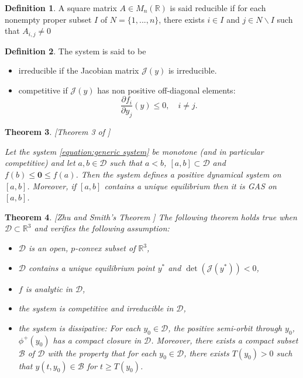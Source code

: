 \documentclass{article}
\newcommand{\R}{\mathbb{R}}
\newtheorem{theorem}{Theorem}
\theoremstyle{definition}
\newtheorem{definition}[theorem]{Definition}
\theoremstyle{remark}
\begin{document}
\begin{appendix}
\begin{definition}\cite{kaszkurewicz_matrix_2012}
A square matrix $A \in M_n (\mathbb{R})$ is said reducible if 
for each nonempty proper subset $I$ of $N = \{1, ..., n\}$, there exists $i \in I$ and $j \in N\backslash I$ such that $A_{i,j} \neq 0$
\end{definition}


\begin{definition} \label{def:monotone}\cite{smith_monotone_1995} The system is said to be 
\begin{itemize}
\item irreducible if the Jacobian matrix $\mathcal{J}(y)$ is irreducible.
\item competitive if $\mathcal{J}(y)$ has non positive off-diagonal elements:
$$ \dfrac{\partial f_i}{\partial y_j}(y) \leq 0, \quad i \neq j.
$$
\end{itemize}
\end{definition}

\begin{theorem} \label{theorem: monotone GAS} [Theorem 3 of \cite{anguelov_monotone_2010}]

Let the system \eqref{equation:generic system} be monotone (and in particular competitive) and let $a,b \in \mathcal{D}$ such that $a <b$, $[a, b] \subset \mathcal{D}$ and $f(b) \leq \mathbf{0} \leq f(a)$. Then the system defines a positive dynamical system on $[a, b] $. Moreover, if $[a, b] $ contains a unique equilibrium then it is GAS on $[a, b] $.
\end{theorem}

\begin{theorem}\label{theorem:Zhu} [Zhu and Smith's Theorem \cite{zhu_stable_1994}]
The following theorem holds true when $\mathcal{D} \subset \R^3$ and verifies the following assumption:
\begin{itemize}
\item $\mathcal{D}$ is an open, $p$-convex subset of $\mathbb{R}^3$,
\item $\mathcal{D}$ contains a unique equilibrium point $y^*$ and $\det(\mathcal{J}(y^*)) < 0$,
\item $f$ is analytic in $\mathcal{D}$,
\item the system is competitive and irreducible in $\mathcal{D}$,
\item the system is dissipative: For each $y_0 \in \mathcal{D}$, the positive semi-orbit through $y_0$, $\phi^+(y_0)$ has a compact closure in $\mathcal{D}$. Moreover, there exists a compact subset $\mathcal{B}$ of $\mathcal{D}$ with the property that for each $y_0 \in \mathcal{D}$, there exists $T(y_0) > 0$ such that $y(t, y_0) \in \mathcal{B}$ for $t \geq T(y_0)$.
\end{itemize}


\end{theorem}
\end{appendix}
\end{document}
